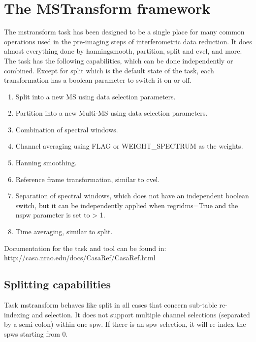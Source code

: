 

\section{The MSTransform framework}\label{Sec:Running}
The mstransform task has been designed to be a single place for many
common operations used in the pre-imaging steps of interferometric
data reduction. It does almost everything done by hanningsmooth,
partition, split and cvel, and more. The task has the following capabilities,
which can be done independently or combined. Except for split which is the default 
state of the task, each transformation has a boolean parameter to switch it on
or off.

\begin{enumerate}
\item Split into a new MS using data selection parameters.
\item Partition into a new Multi-MS using data selection parameters.
\item Combination of spectral windows.
\item Channel averaging using FLAG or WEIGHT_SPECTRUM as the weights.
\item Hanning smoothing.
\item Reference frame transformation, similar to cvel.
\item Separation of spectral windows, which does not have an independent
boolean switch, but it can be independently applied when regridms=True and
the nspw parameter is set to > 1.
\item Time averaging, similar to split.

\end{enumerate}


Documentation for the task and tool can be found in:
 {http://casa.nrao.edu/docs/CasaRef/CasaRef.html}

\subsection{Splitting capabilities}
Task mstransform behaves like split in all cases that concern sub-table re-indexing
and selection. It does not support multiple channel selections (separated by a
semi-colon) within one spw. If there is an spw selection, it will re-index the
spws starting from 0.

